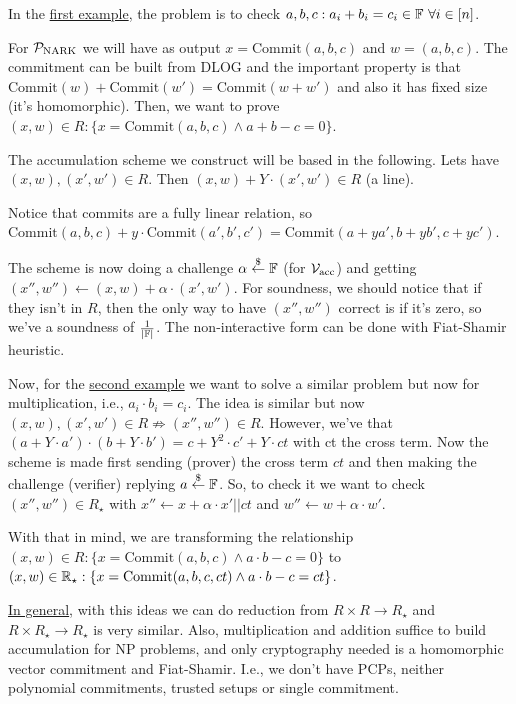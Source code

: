   In the \underline{first example}, the problem is to check $a,b,c : a_i + b_i = c_i \in \mathbb{F}\ \forall i \in [n]$.

  For $\mathcal{P}_{\text{NARK}}$ we will have as output $x = \text{Commit}(a,b,c)$ and $w = (a,b,c)$.
  The commitment can be built from DLOG and the important property is that $\text{Commit}(w) + \text{Commit}(w') = \text{Commit}(w+w')$
  and also it has fixed size (it's homomorphic).
  Then, we want to prove $(x,w) \in R : \{x = \text{Commit}(a,b,c) \land a+b-c = 0\}$.

  The accumulation scheme we construct will be based in the following.
  Lets have $(x,w),(x',w') \in R$. Then $(x,w) + Y \cdot (x',w') \in R$ (a line).
  \begin{remark}
    Notice that commits are a fully linear relation, so $\text{Commit}(a,b,c) + y \cdot \text{Commit}(a',b',c') = \text{Commit}(a+ya',b+yb',c+yc')$.
  \end{remark}
  
  The scheme is now doing a challenge $\alpha \overset{\$}{\leftarrow} \mathbb{F}$ (for $\mathcal{V}_{\text{acc}}$) and getting
  $(x'',w'') \leftarrow (x,w) + \alpha \cdot (x',w')$.
  For soundness, we should notice that if they isn't in $R$, then the only way to have 
  $(x'',w'')$ correct is if it's zero, so we've a soundness of $\frac{1}{\left| \mathbb{F} \right|}$.
  The non-interactive form can be done with Fiat-Shamir heuristic.

  Now, for the \underline{second example} we want to solve a similar problem but now for 
  multiplication, i.e., $a_i \cdot b_i = c_i$.
  The idea is similar but now $(x,w),(x',w') \in R \not\Rightarrow (x'',w'')\in R$.
  However, we've that $(a+Y\cdot a') \cdot (b + Y \cdot b') = c + Y^2 \cdot c' + Y \cdot ct$
  with ct the cross term.
  Now the scheme is made first sending (prover) the cross term $ct$ and then making the 
  challenge (verifier) replying $a \overset{\$}{\leftarrow} \mathbb{F}$.
  So, to check it we want to check $(x'',w'') \in R_\star$ with $x'' \leftarrow x+\alpha\cdot x'||ct$
  and $w'' \leftarrow w+\alpha\cdot w'$.

  With that in mind, we are transforming the relationship $(x,w)\in R : \{x = \text{Commit}(a,b,c) \land a\cdot b-c=0\}$
  to $(x,w)\in\R_\star : \{x=\text{Commit}(a,b,c,ct) \land a\cdot b-c=ct\}$.

  \underline{In general}, with this ideas we can do reduction from $R\times R \to R_\star$ and 
  $R\times R_\star \to R_\star$ is very similar.
  Also, multiplication and addition suffice to build accumulation for NP problems,
  and only cryptography needed is a homomorphic vector commitment and Fiat-Shamir.
  I.e., we don't have PCPs, neither polynomial commitments, trusted setups or single commitment.

